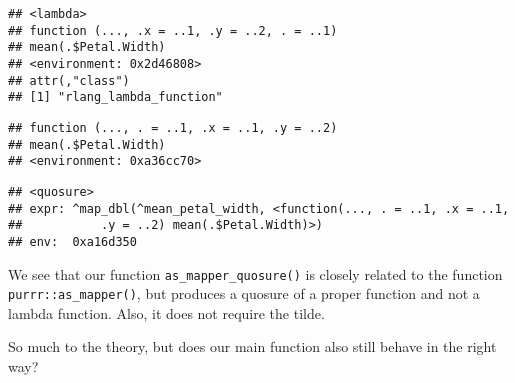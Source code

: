 \documentclass[]{book}
\newenvironment{Shaded}{\begin{snugshade}}{\end{snugshade}}
\newcommand{\DataTypeTok}[1]{\textcolor[rgb]{0.13,0.29,0.53}{#1}}
\newcommand{\KeywordTok}[1]{\textcolor[rgb]{0.13,0.29,0.53}{\textbf{#1}}}
\newcommand{\NormalTok}[1]{#1}
\newcommand{\OperatorTok}[1]{\textcolor[rgb]{0.81,0.36,0.00}{\textbf{#1}}}
\newcommand{\StringTok}[1]{\textcolor[rgb]{0.31,0.60,0.02}{#1}}
\begin{document}
\begin{verbatim}
## <lambda>
## function (..., .x = ..1, .y = ..2, . = ..1) 
## mean(.$Petal.Width)
## <environment: 0x2d46808>
## attr(,"class")
## [1] "rlang_lambda_function"
\end{verbatim}

\begin{Shaded}
\end{Shaded}

\begin{verbatim}
## function (..., . = ..1, .x = ..1, .y = ..2) 
## mean(.$Petal.Width)
## <environment: 0xa36cc70>
\end{verbatim}

\begin{Shaded}
\end{Shaded}

\begin{verbatim}
## <quosure>
## expr: ^map_dbl(^mean_petal_width, <function(..., . = ..1, .x = ..1,
##           .y = ..2) mean(.$Petal.Width)>)
## env:  0xa16d350
\end{verbatim}

We see that our function \texttt{as\_mapper\_quosure()} is closely related to the function \texttt{purrr::as\_mapper()}, but produces a quosure of a proper function and not a lambda function.
Also, it does not require the tilde.

So much to the theory, but does our main function also still behave in the right way?

\begin{Shaded}
\end{Shaded}
\end{document}

